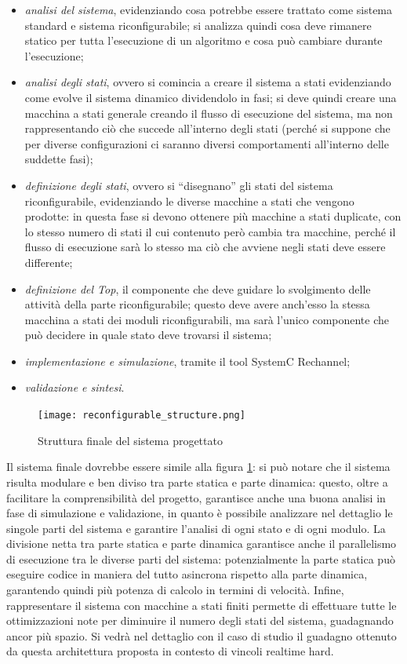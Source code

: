 \documentclass[11pt]{article} %
\begin{document}
\begin{itemize}
  \item \textit{analisi del sistema}, evidenziando cosa potrebbe essere trattato come sistema standard e sistema riconfigurabile; si analizza quindi cosa deve rimanere statico per tutta l'esecuzione di un algoritmo e cosa può cambiare durante l'esecuzione;
  \item \textit{analisi degli stati}, ovvero si comincia a creare il sistema a stati evidenziando come evolve il sistema dinamico dividendolo in fasi; si deve quindi creare una macchina a stati generale creando il flusso di esecuzione del sistema, ma non rappresentando ciò che succede all'interno degli stati (perché si suppone che per diverse configurazioni ci saranno diversi comportamenti all'interno delle suddette fasi);
  \item \textit{definizione degli stati}, ovvero si ``disegnano'' gli stati del sistema riconfigurabile, evidenziando le diverse macchine a stati che vengono prodotte: in questa fase si devono ottenere più macchine a stati duplicate, con lo stesso numero di stati il cui contenuto però cambia tra macchine, perché il flusso di esecuzione sarà lo stesso ma ciò che avviene negli stati deve essere differente;
  \item \textit{definizione del Top}, il componente che deve guidare lo svolgimento delle attività della parte riconfigurabile; questo deve avere anch'esso la stessa macchina a stati dei moduli riconfigurabili, ma sarà l'unico componente che può decidere in quale stato deve trovarsi il sistema;
  \item \textit{implementazione e simulazione}, tramite il tool SystemC Rechannel;
  \item \textit{validazione e sintesi}.
\end{itemize}

\begin{figure}[!ht]
\centering
\texttt{[image: reconfigurable\_structure.png]}
\caption{Struttura finale del sistema progettato}\label{fig:6}
\end{figure}

Il sistema finale dovrebbe essere simile alla figura \ref{fig:6}: si può notare che il sistema risulta modulare e ben diviso tra parte statica e parte dinamica: questo, oltre a facilitare la comprensibilità del progetto, garantisce anche una buona analisi in fase di simulazione e validazione, in quanto è possibile analizzare nel dettaglio le singole parti del sistema e garantire l'analisi di ogni stato e di ogni modulo.
La divisione netta tra parte statica e parte dinamica garantisce anche il parallelismo di esecuzione tra le diverse parti del sistema: potenzialmente la parte statica può eseguire codice in maniera del tutto asincrona rispetto alla parte dinamica, garantendo quindi più potenza di calcolo in termini di velocità. Infine, rappresentare il sistema con macchine a stati finiti permette di effettuare tutte le ottimizzazioni note per diminuire il numero degli stati del sistema, guadagnando ancor più spazio.
Si vedrà nel dettaglio con il caso di studio il guadagno ottenuto da questa architettura proposta in contesto di vincoli realtime hard.
\end{document}
